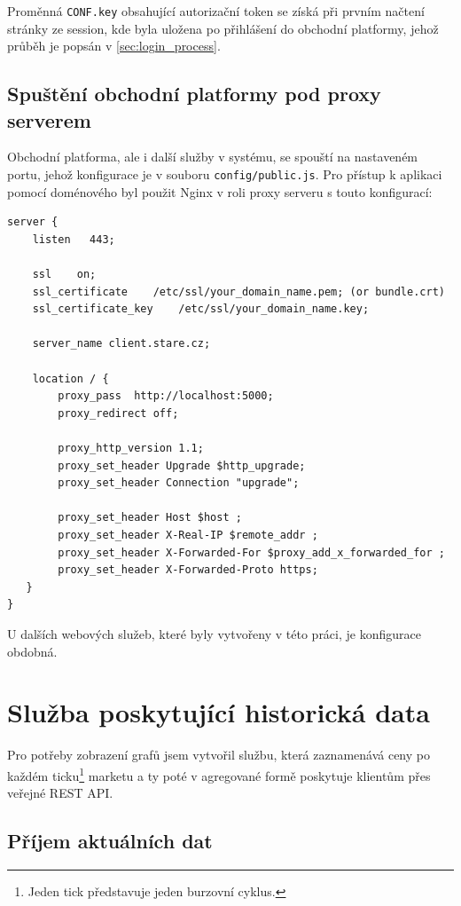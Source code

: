 \documentclass[thesis=M,czech]{FITthesis}[2012/06/26]
\begin{document}
Proměnná \texttt{CONF.key} obsahující autorizační token se získá při prvním načtení stránky ze session, kde byla uložena po přihlášení do obchodní platformy, jehož průběh je popsán v \ref{sec:login_process}.


\subsection{Spuštění obchodní platformy pod proxy serverem}
	
	Obchodní platforma, ale i další služby v systému, se spouští na nastaveném portu, jehož konfigurace je v souboru \texttt{config/public.js}. Pro přístup k aplikaci pomocí doménového byl použit Nginx v roli proxy serveru s touto konfigurací:

\begin{lstlisting}[basicstyle={\tiny\ttfamily}, frame=single] 	
server {
	listen   443;

	ssl    on;
	ssl_certificate    /etc/ssl/your_domain_name.pem; (or bundle.crt)
	ssl_certificate_key    /etc/ssl/your_domain_name.key;

	server_name client.stare.cz;
	
	location / { 
		proxy_pass  http://localhost:5000;
		proxy_redirect off; 

		proxy_http_version 1.1;
		proxy_set_header Upgrade $http_upgrade;
		proxy_set_header Connection "upgrade";

		proxy_set_header Host $host ; 
		proxy_set_header X-Real-IP $remote_addr ; 
		proxy_set_header X-Forwarded-For $proxy_add_x_forwarded_for ; 
		proxy_set_header X-Forwarded-Proto https; 
   } 
}
\end{lstlisting}

	U dalších webových služeb, které byly vytvořeny v této práci, je konfigurace obdobná.


\section{Služba poskytující historická data}
	
	Pro potřeby zobrazení grafů jsem vytvořil službu, která zaznamenává ceny po každém ticku\footnote{Jeden tick představuje jeden burzovní cyklus.} marketu a ty poté v agregované formě poskytuje klientům přes veřejné REST API.
	
\subsection{Příjem aktuálních dat}
	
\end{document}

